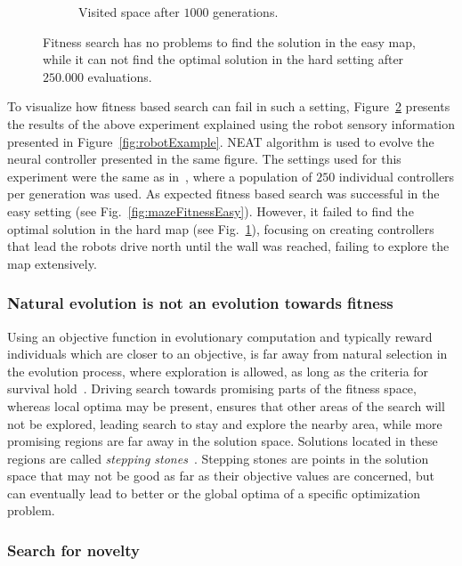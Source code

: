 \begin{figure}[t!]
\begin{subfigure}[b]{0.3\textwidth}
\caption{Visited space after $1000$ generations.}
\label{fig:mazeFitnessHard}
\end{subfigure}
\caption{Fitness search has no problems to find the solution in the easy map, while it can not find the optimal solution in the hard setting after $250.000$ evaluations.}
\label{fig:mazeFitness}
\end{figure}


To visualize how fitness based search can fail in such a setting, Figure~\ref{fig:mazeFitness} presents the results of the above experiment explained using the robot sensory information presented in Figure~\ref{fig:robotExample}. NEAT algorithm is used to evolve the neural controller presented in the same figure. The settings used for this experiment were the same as in~\citep{lehman2011abandoning}, where a population of $250$ individual controllers per generation was used. As expected fitness based search was successful in the easy setting (see Fig.~\ref{fig:mazeFitnessEasy}). However, it failed to find the optimal solution in the hard map (see Fig.~\ref{fig:mazeFitnessHard}), focusing on creating controllers that lead the robots drive north until the wall was reached, failing to explore the map extensively.

\subsubsection*{Natural evolution is not an evolution towards fitness}

Using an objective function in evolutionary computation and typically reward individuals which are closer to an objective, is far away from natural selection in the evolution process, where exploration is allowed, as long as the criteria for survival hold~\citep{lehman2010revising}. Driving search towards promising parts of the fitness space, whereas local optima may be present, ensures that other areas of the search will not be explored, leading search to stay and explore the nearby area, while more promising regions are far away in the solution space. Solutions located in these regions are called \emph{stepping stones}~\citep{lehman2008exploiting,lehman2011abandoning,lehman2010revising,risi2009novelty}. Stepping stones are points in the solution space that may not be good as far as their objective values are concerned, but can eventually lead to better or the global optima of a specific optimization problem.


\subsubsection*{Search for novelty}

